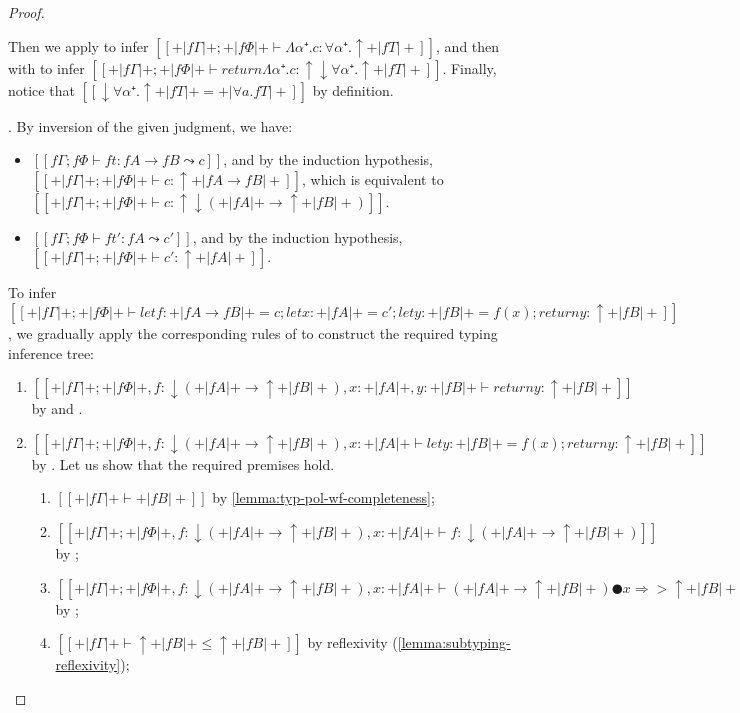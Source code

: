\begin{proof}
\begin{caseof}
      Then we apply  to infer
      $[[+|fΓ|+ ; +|fΦ|+  ⊢ Λα⁺.c : ∀α⁺.↑+|fT|+]]$,
      and then 
       with
      to infer
      $[[+|fΓ|+ ; +|fΦ|+  ⊢ return {Λα⁺.c} : ↑↓∀α⁺.↑+|fT|+]]$.
      Finally, notice that $[[↓∀α⁺.↑+|fT|+ = +|∀a.fT|+]]$ by definition.

    \item {}.
      By inversion of the given judgment, we have:
      \begin{itemize}
        \item $[[fΓ ; fΦ ⊢ ft : fA → fB  ⤳  c]]$,
          and by the induction hypothesis,
          $[[+|fΓ|+ ; +|fΦ|+ ⊢ c : ↑+|fA → fB|+]]$,
          which is equivalent to
          $[[+|fΓ|+ ; +|fΦ|+ ⊢ c : ↑↓(+|fA|+ → ↑+|fB|+)]]$.
        \item $[[fΓ ; fΦ ⊢ ft' : fA  ⤳  c']]$, 
          and by the induction hypothesis,
          $[[+|fΓ|+ ; +|fΦ|+ ⊢ c' : ↑+|fA|+]]$.
      \end{itemize}
      To infer 
      $[[+|fΓ|+ ; +|fΦ|+ ⊢ let f : +|fA → fB|+ = c; let x : +|fA|+ = c'; let y:+|fB|+ = f(x); return y : ↑+|fB|+]]$, 
      we gradually apply the corresponding rules of \fexists to construct the required typing inference tree:
      \begin{enumerate}
        \item $[[+|fΓ|+ ; +|fΦ|+, f:↓(+|fA|+ → ↑+|fB|+), x:+|fA|+, y:+|fB|+ ⊢ return y : ↑+|fB|+]]$ by 
           and .  
        \item $[[+|fΓ|+ ; +|fΦ|+, f:↓(+|fA|+ → ↑+|fB|+), x:+|fA|+ ⊢ let y:+|fB|+ = f(x); return y : ↑+|fB|+]]$ by 
          . Let us show that the 
          required premises hold. 
          \begin{enumerate}
            \item $[[+|fΓ|+ ⊢ +|fB|+]]$ by \cref{lemma:typ-pol-wf-completeness};
            \item $[[+|fΓ|+ ; +|fΦ|+, f:↓(+|fA|+ → ↑+|fB|+), x:+|fA|+ ⊢ f : ↓(+|fA|+ → ↑+|fB|+)]]$ by 
              ;
            \item $[[+|fΓ|+ ; +|fΦ|+, f:↓(+|fA|+ → ↑+|fB|+), x:+|fA|+ ⊢ (+|fA|+ → ↑+|fB|+) ● x ⇒> ↑+|fB|+]]$
              by ;
            \item $[[+|fΓ|+ ⊢ ↑+|fB|+ ≤ ↑+|fB|+]]$ by reflexivity (\cref{lemma:subtyping-reflexivity});

\end{enumerate}
\end{enumerate}
\end{caseof}
\end{proof}
